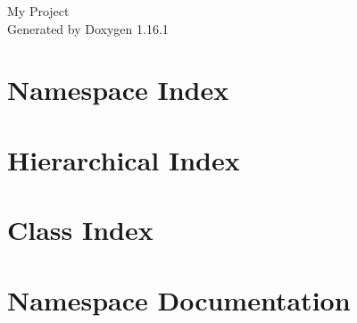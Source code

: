 \documentclass[twoside]{book}
\newcommand{\+}{\discretionary{\mbox{\scriptsize$\hookleftarrow$}}{}{}}
\newcommand{\clearemptydoublepage}{%
    \newpage{\pagestyle{empty}\cleardoublepage}%
  }
\begin{document}
  \raggedbottom
    \hypersetup{pageanchor=false,
                bookmarksnumbered=true,
                pdfencoding=unicode
               }
  \begin{titlepage}
  \vspace*{7cm}
  \begin{center}%
  {\Large My Project}\\
  \vspace*{1cm}
  {\large Generated by Doxygen 1.16.1}\\
  \end{center}
  \end{titlepage}
  \clearemptydoublepage
  \tableofcontents
  \clearemptydoublepage
  \hypersetup{pageanchor=true}
\chapter{Namespace Index}

\chapter{Hierarchical Index}

\chapter{Class Index}

\chapter{Namespace Documentation}



















\end{document}
